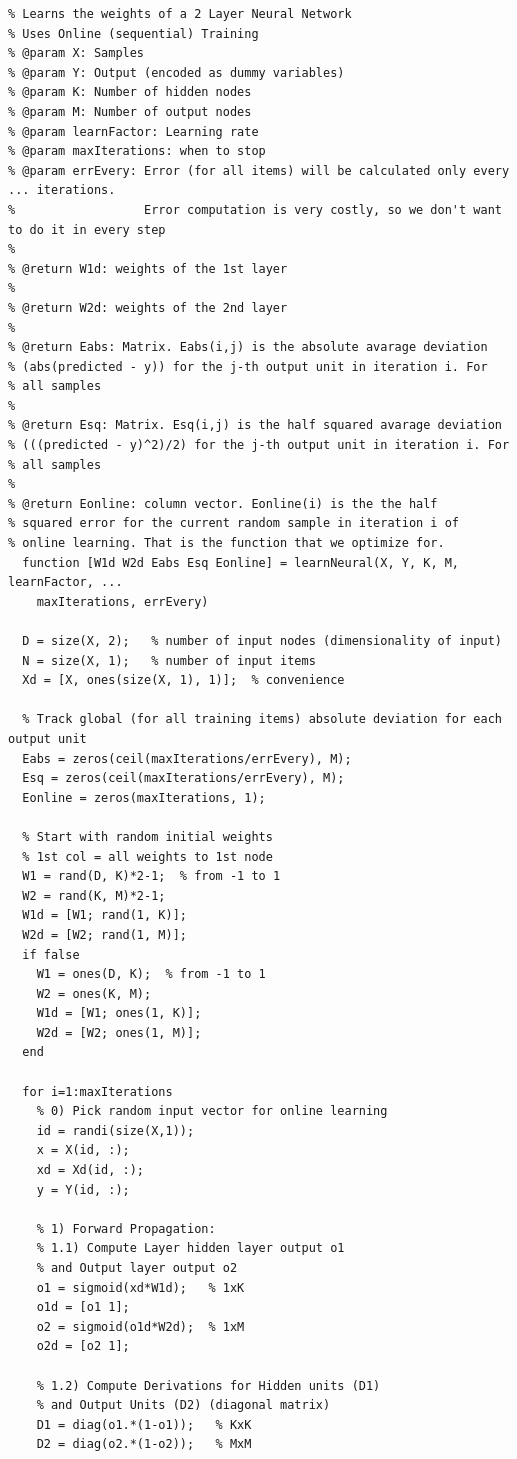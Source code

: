\documentclass{article}
\begin{document}
\begin{lstlisting}
% Learns the weights of a 2 Layer Neural Network
% Uses Online (sequential) Training
% @param X: Samples
% @param Y: Output (encoded as dummy variables)
% @param K: Number of hidden nodes
% @param M: Number of output nodes
% @param learnFactor: Learning rate
% @param maxIterations: when to stop
% @param errEvery: Error (for all items) will be calculated only every ... iterations.
%                  Error computation is very costly, so we don't want to do it in every step
% 
% @return W1d: weights of the 1st layer
%
% @return W2d: weights of the 2nd layer
%
% @return Eabs: Matrix. Eabs(i,j) is the absolute avarage deviation
% (abs(predicted - y)) for the j-th output unit in iteration i. For
% all samples
%
% @return Esq: Matrix. Esq(i,j) is the half squared avarage deviation
% (((predicted - y)^2)/2) for the j-th output unit in iteration i. For
% all samples
%
% @return Eonline: column vector. Eonline(i) is the the half
% squared error for the current random sample in iteration i of
% online learning. That is the function that we optimize for.
  function [W1d W2d Eabs Esq Eonline] = learnNeural(X, Y, K, M, learnFactor, ...
  	maxIterations, errEvery)
  
  D = size(X, 2);   % number of input nodes (dimensionality of input)
  N = size(X, 1);   % number of input items
  Xd = [X, ones(size(X, 1), 1)];  % convenience

  % Track global (for all training items) absolute deviation for each output unit
  Eabs = zeros(ceil(maxIterations/errEvery), M); 
  Esq = zeros(ceil(maxIterations/errEvery), M);
  Eonline = zeros(maxIterations, 1);

  % Start with random initial weights
  % 1st col = all weights to 1st node
  W1 = rand(D, K)*2-1;  % from -1 to 1
  W2 = rand(K, M)*2-1;
  W1d = [W1; rand(1, K)];
  W2d = [W2; rand(1, M)];
  if false
    W1 = ones(D, K);  % from -1 to 1
    W2 = ones(K, M);
    W1d = [W1; ones(1, K)];
    W2d = [W2; ones(1, M)];
  end
  
  for i=1:maxIterations
    % 0) Pick random input vector for online learning
    id = randi(size(X,1));
    x = X(id, :);
    xd = Xd(id, :);
    y = Y(id, :);
    
    % 1) Forward Propagation:
    % 1.1) Compute Layer hidden layer output o1
    % and Output layer output o2
    o1 = sigmoid(xd*W1d);   % 1xK
    o1d = [o1 1];
    o2 = sigmoid(o1d*W2d);  % 1xM
    o2d = [o2 1];
    
    % 1.2) Compute Derivations for Hidden units (D1)
    % and Output Units (D2) (diagonal matrix)
    D1 = diag(o1.*(1-o1));   % KxK
    D2 = diag(o2.*(1-o2));   % MxM
    

\end{lstlisting}
\end{document}
